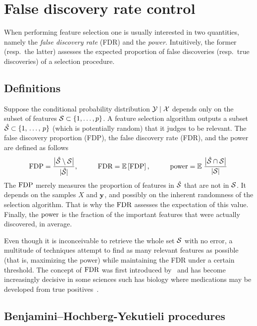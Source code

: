 \section{False discovery rate control}\label{sec:fdrc}

When performing feature selection one is usually interested in two quantities,
namely the \emph{false discovery rate} (FDR) and the \emph{power}.
Intuitively, the former (resp.\ the latter) assesses the expected proportion of false discoveries
(resp.\ true discoveries) of a selection procedure.

\subsection{Definitions}\label{subsec:fdr_def}

Suppose the conditional probability distribution $\mathcal{Y} \mid \mathcal{X}$ depends only on the subset of features
$\mathcal{S} \subset \left\{ 1, \dots, p \right\}$.
A feature selection algorithm outputs a subset $\hat{\mathcal{S}} \subset \left\{ 1,\, \dots,\, p \right\}$ (which is potentially random)
that it judges to be relevant.
The false discovery proportion (FDP), the false discovery rate (FDR), and the power are defined as follows
\begin{equation}\label{eq:fdr_def}
    \text{FDP} = \frac
        {\big\lvert \hat{\mathcal{S}} \setminus \mathcal{S} \big\rvert}
        {\lvert \hat{\mathcal{S}} \rvert}
    \text{,}\qquad\quad
    \text{FDR} = {\mathbb E}\left[\text{FDP}\right]
    \text{,}\qquad\quad
    \text{power} = {\mathbb E}\left.
        \frac
            {\big\lvert \hat{\mathcal{S}} \cap \mathcal{S} \big\rvert}
            {\lvert \mathcal{S} \rvert}
    \right.
\end{equation}
The $\text{FDP}$ merely measures the proportion of features in $\hat{\mathcal{S}}$ that are not in $\mathcal{S}$.
It depends on the samples $X$ and $\mathbf{y}$,
and possibly on the inherent randomness of the selection algorithm.
That is why the $\text{FDR}$ assesses the expectation of this value.
Finally, the $\text{power}$ is the fraction of the important features that were actually discovered, in average.

Even though it is inconceivable to retrieve the whole set $\mathcal{S}$ with no error,
a multitude of techniques attempt to find as many relevant features as possible
(that is, maximizing the power)
while maintaining the FDR under a certain threshold.
The concept of $\text{FDR}$ was first introduced by~\cite{bh} and has become increasingly decisive in some
sciences such has biology where medications may be developed from true positives~\citep{statistical_inference_genome}.

\subsection{Benjamini–Hochberg-Yekutieli procedures}\label{subsec:bhq}

